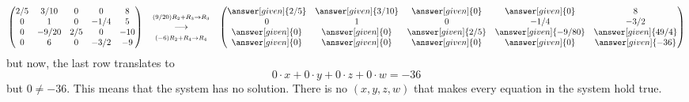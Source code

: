 \documentclass{ximera}
\begin{document}
\begin{example}[No solutions]
\begin{explanation}
\[
  \begin{pmatrix}
    {2/5}&  {3/10} & {0} &{0} &8 \\
    {0}&  {1} & {0} &{-1/4} & 5\\
    {0}&  {-9/20} & {2/5} &{0} &-10\\
    {0}&  {6} & {0} &{-3/2} &-9
  \end{pmatrix}
  \quad
  \begin{matrix}
    \scriptstyle (9/20) R_2 + R_3\to R_3\\
    \longrightarrow \\
    \scriptstyle(-6) R_2+R_4\to R_4
  \end{matrix}
  \quad
  \begin{pmatrix}
    \answer[given]{2/5}&  \answer[given]{3/10} & \answer[given]{0} &\answer[given]{0} &8 \\
    {0}&  {1} & {0} &{-1/4} & -3/2\\
    \answer[given]{0}&  \answer[given]{0} & \answer[given]{2/5} &\answer[given]{-9/80} &\answer[given]{49/4}\\
    \answer[given]{0}&  \answer[given]{0} & \answer[given]{0} &\answer[given]{0} &\answer[given]{-36}
  \end{pmatrix}
\]
but now, the last row translates to
\[
0\cdot x+0\cdot y+0\cdot z+0\cdot w=-36
\]
but $0\ne -36$. This means that the system has no solution. There is
no $(x,y,z,w)$ that makes every equation in the system hold true.
\end{explanation}
\end{example}
\end{document}
